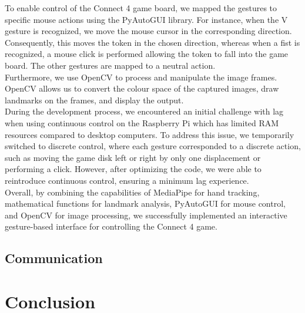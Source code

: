 \documentclass[12pt, a4paper, oneside]{report}
\begin{document}
	To enable control of the Connect 4 game board, we mapped the gestures to specific mouse actions using the PyAutoGUI library. For instance, when the V gesture is recognized, we move the mouse cursor in the corresponding direction. Consequently, this moves the token in the chosen direction, whereas when a fist is recognized, a mouse click is performed allowing the token to fall into the game board. The other gestures are mapped to a neutral action. \\

	Furthermore, we use OpenCV to process and manipulate the image frames. OpenCV allows us to convert the colour space of the captured images, draw landmarks on the frames, and display the output. \\

	During the development process, we encountered an initial challenge with lag when using continuous control on the Raspberry Pi which has limited RAM resources compared to desktop computers. To address this issue, we temporarily switched to discrete control, where each gesture corresponded to a discrete action, such as moving the game disk left or right by only one displacement or performing a click. However, after optimizing the code, we were able to reintroduce continuous control, ensuring a minimum lag experience. \\

	Overall, by combining the capabilities of MediaPipe for hand tracking, mathematical functions for landmark analysis, PyAutoGUI for mouse control, and OpenCV for image processing, we successfully implemented an interactive gesture-based interface for controlling the Connect 4 game. \\

	\section{Communication}

	\chapter{Conclusion}
\end{document}
